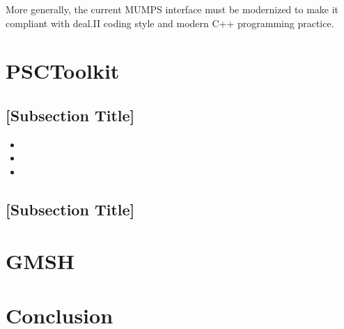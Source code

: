\documentclass[a4paper,12pt]{article}
\begin{document}
More generally, the current MUMPS interface must be modernized to make
it compliant with deal.II coding style and modern C++ programming
practice.


\newpage

\section{PSCToolkit}
\label{sec:section3}

\lipsum[8-9]

\subsection{{[Subsection Title]}}
\begin{itemize}[left=1em, itemsep=0pt, topsep=0pt] 
    \item \lipsum[10][1-2]
    \item \lipsum[10][3-4]
    \item \lipsum[10][5-6]
\end{itemize}

\subsection{{[Subsection Title]}}
\lipsum[11]

\newpage

\section{GMSH}
\label{sec:section4}

\lipsum[12-13]

\newpage 

\section{{Conclusion}} \label{sec:conclusion}

\lipsum[20]

\label{MyLastPage}
\end{document}

